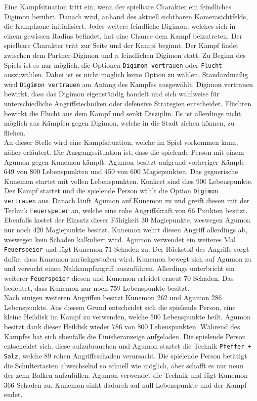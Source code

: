 Eine Kampfsituation tritt ein, wenn der spielbare Charakter ein feindliches Digimon berührt. Danach wird, anhand des aktuell sichtbaren Kamerasichtfelds, die Kampfzone initialisiert\cite{combat-asm}. Jedes weitere feindliche Digimon, welches sich in einem gewissen Radius befindet, hat eine Chance dem Kampf beizutreten. Der spielbare Charakter tritt zur Seite und der Kampf beginnt. Der Kampf findet zwischen dem Partner-Digimon und $n$ feindlichen Digimon statt. Zu Beginn des Spiels ist es nur möglich, die Optionen \texttt{Digimon vertrauen} oder \texttt{Flucht} auszuwählen. Dabei ist es nicht möglich keine Option zu wählen. Standardmäßig wird \texttt{Digimon vertrauen} am Anfang des Kampfes ausgewählt. Digimon vertrauen bewirkt, dass das Digimon eigenständig handelt und sich wahlweise für unterschiedliche Angriffstechniken oder defensive Strategien entscheidet. Flüchten bewirkt die Flucht aus dem Kampf und senkt Disziplin. Es ist allerdings nicht möglich aus Kämpfen gegen Digimon, welche in die Stadt ziehen können, zu fliehen.\\

An dieser Stelle wird eine Kampfsituation, welche im Spiel vorkommen kann, näher erläutert. Die Ausgangssituation ist, dass die spielende Person mit einem Agumon gegen Kunemon kämpft. Agumon besitzt aufgrund vorheriger Kämpfe 649 von 800 Lebenspunkten und 450 von 600 Magiepunkten. Das gegnerische Kunemon startet mit vollen Lebenspunkten. Konkret sind dies 900 Lebenspunkte. Der Kampf startet und die spielende Person wählt die Option \texttt{Digimon vertrauen} aus. Danach läuft Agumon auf Kunemon zu und greift diesen mit der Technik \texttt{Feuerspeier} an, welche eine rohe Angriffskraft von 66 Punkten besitzt. Ebenfalls kostet der Einsatz dieser Fähigkeit 30 Magiepunkte, weswegen Agumon nur noch 420 Magiepunkte besitzt. Kunemon wehrt diesen Angriff allerdings ab, weswegen kein Schaden kalkuliert wird. Agumon verwendet ein weiteres Mal \texttt{Feuerspeier} und fügt Kunemon 71 Schaden zu. Der Rückstoß des Angriffs sorgt dafür, dass Kunemon zurückgestoßen wird. Kunemon bewegt sich auf Agumon zu und versucht einen Nahkampfangriff auszuführen. Allerdings unterbricht ein weiterer \texttt{Feuerspeier} diesen und Kunemon erleidet erneut 70 Schaden. Das bedeutet, dass Kunemon nur noch 759 Lebenspunkte besitzt.\\

Nach einigen weiteren Angriffen besitzt Kunemon 262 und Agumon 286 Lebenspunkte. Aus diesem Grund entscheidet sich die spielende Person, eine kleine Heildisk im Kampf zu verwenden, welche 500 Lebenspunkte heilt. Agumon besitzt dank dieser Heildisk wieder 786 von 800 Lebenspunkten. Während des Kampfes hat sich ebenfalls die Finisheranzeige aufgeladen. Die spielende Person entscheidet sich, diese aufzubrauchen und Agumon startet die Technik \texttt{Pfeffer + Salz}, welche 89 rohen Angriffsschaden verursacht. Die spielende Person betätigt die Schultertasten abwechselnd so schnell wie möglich, aber schafft es nur neun der zehn Balken aufzufüllen. Agumon verwendet die Technik und fügt Kunemon 366 Schaden zu. Kunemon sinkt dadurch auf null Lebenspunkte und der Kampf endet. \\

